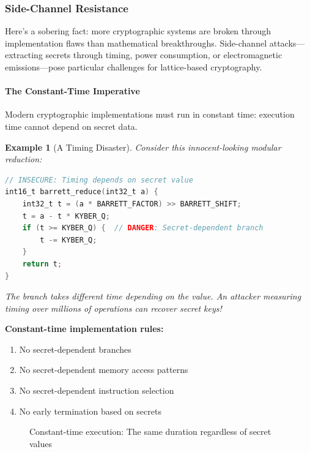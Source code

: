 \documentclass[11pt,a4paper]{article}
\newtheorem{example}{Example}
\begin{document}
\subsubsection{Side-Channel Resistance}

Here's a sobering fact: more cryptographic systems are broken through implementation flaws than mathematical breakthroughs. Side-channel attacks—extracting secrets through timing, power consumption, or electromagnetic emissions—pose particular challenges for lattice-based cryptography.

\paragraph{The Constant-Time Imperative}

Modern cryptographic implementations must run in constant time: execution time cannot depend on secret data.

\begin{example}[A Timing Disaster]
Consider this innocent-looking modular reduction:
\begin{lstlisting}[language=C]
// INSECURE: Timing depends on secret value
int16_t barrett_reduce(int32_t a) {
    int32_t t = (a * BARRETT_FACTOR) >> BARRETT_SHIFT;
    t = a - t * KYBER_Q;
    if (t >= KYBER_Q) {  // DANGER: Secret-dependent branch
        t -= KYBER_Q;
    }
    return t;
}
\end{lstlisting}

The branch takes different time depending on the value. An attacker measuring timing over millions of operations can recover secret keys!
\end{example}

\textbf{Constant-time implementation rules:}
\begin{enumerate}
    \item No secret-dependent branches
    \item No secret-dependent memory access patterns
    \item No secret-dependent instruction selection
    \item No early termination based on secrets
\end{enumerate}

\begin{figure}[h]
\centering
{}
\caption{Constant-time execution: The same duration regardless of secret values}
\end{figure}
\end{document}
